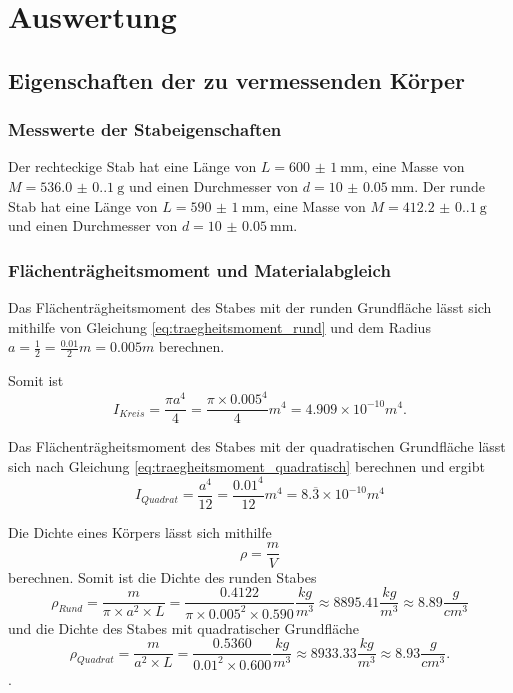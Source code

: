 \section{Auswertung}\label{sec:Auswertung}
\subsection{Eigenschaften der zu vermessenden Körper}
\subsubsection{Messwerte der Stabeigenschaften}
Der rechteckige Stab hat eine Länge von $L=\qty{600(1)}{\milli\meter}$, eine Masse von $M=\qty{536.0(0.1)}{\gram}$
und einen Durchmesser von $d=\qty{10(0.05)}{\milli\meter}$.
Der runde Stab hat eine Länge von $L=\qty{590(1)}{\milli\meter}$, eine Masse von $M=\qty{412.2(0.1)}{\gram}$
und einen Durchmesser von $d=\qty{10(0.05)}{\milli\meter}$.


\subsubsection{Flächenträgheitsmoment und Materialabgleich}

Das Flächenträgheitsmoment des Stabes mit der runden Grundfläche lässt sich mithilfe von Gleichung \eqref{eq:traegheitsmoment_rund} und dem Radius $a=\frac{1}{2}=\frac{0.01}{2}m=0.005m$ berechnen.

\noindent Somit ist
\begin{equation*}
  I_{Kreis}=\frac{\pi a^4}{4}=\frac{\pi\times 0.005^4}{4}m^4=4.909\times 10^{-10}m^4\text{.}
\end{equation*}

\noindent Das Flächenträgheitsmoment des Stabes mit der quadratischen Grundfläche lässt sich nach Gleichung \eqref{eq:traegheitsmoment_quadratisch} berechnen und ergibt
\begin{equation*}
  I_{Quadrat}=\frac{a^4}{12}=\frac{0.01^4}{12}m^4=8.\overline{3}\times 10^{-10}m^4
\end{equation*}

\noindent Die Dichte eines Körpers lässt sich mithilfe
\begin{equation*}
  \rho=\frac{m}{V}
\end{equation*}
berechnen. Somit ist die Dichte des runden Stabes
\begin{equation*}
  \rho_{Rund}=\frac{m}{\pi \times a^2 \times L}=\frac{0.4122}{\pi \times 0.005^2 \times 0.590}\frac{kg}{m^3} \approx 8895.41\frac{kg}{m^3}\approx 8.89\frac{g}{cm^3}
\end{equation*}
und die Dichte des Stabes mit quadratischer Grundfläche
\begin{equation*}
  \rho_{Quadrat}=\frac{m}{a^2 \times L}=\frac{0.5360}{0.01^2 \times 0.600}\frac{kg}{m^3} \approx 8933.33\frac{kg}{m^3} \approx 8.93\frac{g}{cm^3}\text{.}
\end{equation*}.


